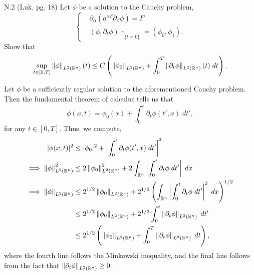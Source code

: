\documentclass{article}
\begin{document}
\begin{prb}{N.2}
	(Luk, pg. 18) Let $\phi$ be a solution to the Cauchy problem, 
	\begin{equation*}
		\left\{
		\begin{alignedat}{1}
			&\partial_{\alpha}(a^{\alpha\beta}\partial_{\beta}\phi) = F \\
			&(\phi, \partial_{t}\phi)\upharpoonright_{\{t = 0\}} = (\phi_{0}, \phi_{1}). 
		\end{alignedat} 
		\right. 
	\end{equation*} 
	Show that 
	\begin{equation*}
		\sup_{t \in [0,T]}\left\Vert \phi \right\Vert_{L^{2}(\mathbb{R}^{n})}(t) \leq C \left(\left\Vert \phi_{0} \right\Vert_{L^{2}(\mathbb{R}^{n})} + \int_{0}^{T}\left\Vert \partial_{t}\phi \right\Vert_{L^{2}(\mathbb{R}^{n})}(t)\;dt\right). 
	\end{equation*} 
\end{prb} 
Let $\phi$ be a sufficiently regular solution to the aforementioned Cauchy problem. Then the fundamental theorem of calculus tells us that 
\begin{equation*}
	\phi(x, t) = \phi_{0}(x) + \int_{0}^{t}\partial_{t}\phi(t', x)\;dt', 
\end{equation*}
for any $t \in [0,T]$. Thus, we compute, 
\begin{align*}
	\begin{split}
		|\phi(x, t)|^{2} &\leq |\phi_{0}|^{2} + \left| \int_{0}^{t}\partial_{t}\phi(t',x)\;dt' \right|^{2} \\
		\implies 
		\left\Vert \phi \right\Vert_{L^{2}(\mathbb{R}^{n})}^{2} &\leq 2\left\Vert \phi_{0} \right\Vert_{L^{2}(\mathbb{R}^{n})}^{2} + 2\int_{\mathbb{R}^{n}}\left| \int_{0}^{t}\partial_{t}\phi\;dt' \right|\;dx \\
		\implies 
		\left\Vert \phi \right\Vert_{L^{2}(\mathbb{R}^{n})} &\leq 2^{1/2}\left\Vert \phi_{0} \right\Vert_{L^{2}(\mathbb{R}^{n})} + 2^{1/2}\left(\int_{\mathbb{R}^{n}}\left| \int_{0}^{t}\partial_{t}\phi\;dt' \right|^{2}\;dx\right)^{1/2} \\
		&\leq 2^{1/2}\left\Vert \phi_{0} \right\Vert_{L^{2}(\mathbb{R}^{n})} + 2^{1/2}\int_{0}^{t}\left\Vert \partial_{t}\phi \right\Vert_{L^{2}(\mathbb{R}^{n})}\;dt' \\
		&\leq 2^{1/2}\left(\left\Vert \phi_{0} \right\Vert_{L^{2}(\mathbb{R}^{n})} + \int_{0}^{T}\left\Vert \partial_{t}\phi \right\Vert_{L^{2}(\mathbb{R}^{n})}\;dt\right), 
	\end{split}
\end{align*} 
where the fourth line follows the Minkowski inequality, and the final line follows from the fact that $\left\Vert \partial_{t}\phi \right\Vert_{L^{2}(\mathbb{R}^{n})} \geq 0$. 
\end{document}
